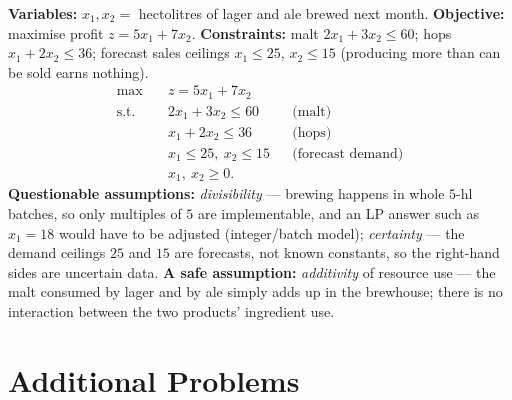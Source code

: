 \begin{solutions}
  \item \textbf{Variables:} $x_1,x_2=$ hectolitres of lager and ale
        brewed next month.
        \textbf{Objective:} maximise profit $z=5x_1+7x_2$.
        \textbf{Constraints:} malt $2x_1+3x_2\le 60$; hops
        $x_1+2x_2\le 36$; forecast sales ceilings $x_1\le 25$,
        $x_2\le 15$ (producing more than can be sold earns nothing).
        \[
          \begin{aligned}
            \max\quad & z=5x_1+7x_2\\
            \text{s.t.}\quad & 2x_1+3x_2\le 60 &&\text{(malt)}\\
            & x_1+2x_2\le 36 &&\text{(hops)}\\
            & x_1\le 25,\ x_2\le 15 &&\text{(forecast demand)}\\
            & x_1,\ x_2\ge 0 .
          \end{aligned}
        \]
        \textbf{Questionable assumptions:} \emph{divisibility} — brewing
        happens in whole $5$-hl batches, so only multiples of $5$ are
        implementable, and an LP answer such as $x_1=18$ would have to be
        adjusted (integer/batch model); \emph{certainty} — the demand
        ceilings $25$ and $15$ are forecasts, not known constants, so the
        right-hand sides are uncertain data. \textbf{A safe assumption:}
        \emph{additivity} of resource use — the malt consumed by lager
        and by ale simply adds up in the brewhouse; there is no
        interaction between the two products' ingredient use.
\end{solutions}

\section{Additional Problems}

